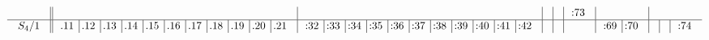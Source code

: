 \documentclass[12pt,a4paper]{amsart}
\begin{document}
\begin{align*}
\begin{array}{r||c|c|c|c|c|c|c|c|c}
\begin{array}{r|r}
\end{array}
&&&&&
\begin{array}{r}%
\llap:73\\%
\end{array}
&\\
\hline
    \begin{array}{r}
      S_4/1 \\
    \end{array}
&
  \begin{array}{r|r|r|r|r|r|r|r|r|r|r}%
\llap.11&\llap.12&\llap.13&\llap.14&\llap.15&\llap.16&\llap.17&\llap.18&\llap.19&\llap.20&\llap.21\\%
\end{array}
&
\begin{array}{r|r|r|r|r|r|r|r|r|r|r}%
\llap:32&\llap:33&\llap:34&\llap:35&\llap:36&\llap:37&\llap:38&\llap:39&\llap:40&\llap:41&\llap:42\\%
\end{array}
&&&&
\begin{array}{r|r}%
\llap:69&\llap:70\\%
\end{array}
&&&
\begin{array}{r}%
\llap:74\\%
\end{array}
\\
  \end{array}
\end{align*}
\end{document}
